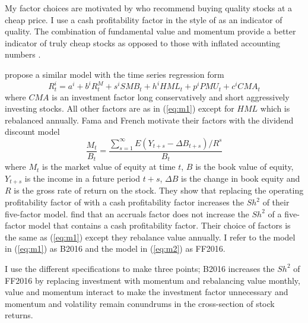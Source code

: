 My factor choices are motivated by \textcite{graham1934security} who recommend buying
quality stocks at a cheap price. I use a cash profitability factor in the style of
\textcite{ball2016accruals} as an indicator of quality. The combination of fundamental
value and momentum provide a better indicator of truly cheap stocks as opposed to those
with inflated accounting numbers \textcite{kok2017facts}.

\textcite{fama2016choosing} propose a similar model with the time series regression form
\begin{equation}
  \label{eq:m2}
  R_t^i=a^i+b^iR_t^M+s^iSMB_t+h^iHML_t+p^iPMU_t+c^iCMA_t
  \end{equation}
where $CMA$ is an investment factor long conservatively and short aggressively investing
stocks. All other factors are as in (\ref{eq:m1}) except for $HML$ which is rebalanced
annually. Fama and French motivate their factors with the dividend discount model
\begin{equation}
  \label{eq:ddm}
  \frac{M_t}{B_t}=\frac{\sum_{s=1}^\infty E(Y_{t+s}-\Delta B_{t+s})/R^s}{B_t}
\end{equation}
where $M_t$ is the market value of equity at time $t$, $B$ is the book value of equity,
$Y_{t+s}$ is the income in a future period $t+s$, $\Delta B$ is the change in book equity
and $R$ is the gross rate of return on the stock. They show that replacing the operating
profitability factor of \textcite{fama2015five} with a cash profitability factor increases
the $Sh^2$ of their five-factor model. \textcite{ball2016accruals} find that an accruals
factor does not increase the $Sh^2$ of a five-factor model that contains a cash
profitability factor. Their choice of factors is the same as (\ref{eq:m1}) except they
rebalance value annually. I refer to the model in (\ref{eq:m1}) as B2016 and the model in
(\ref{eq:m2}) as FF2016.

I use the different specifications to make three points; B2016 increases the $Sh^2$ of
FF2016 by replacing investment with momentum and rebalancing value monthly, value and
momentum interact to make the investment factor unnecessary and momentum and volatility
remain conundrums in the cross-section of stock returns.
